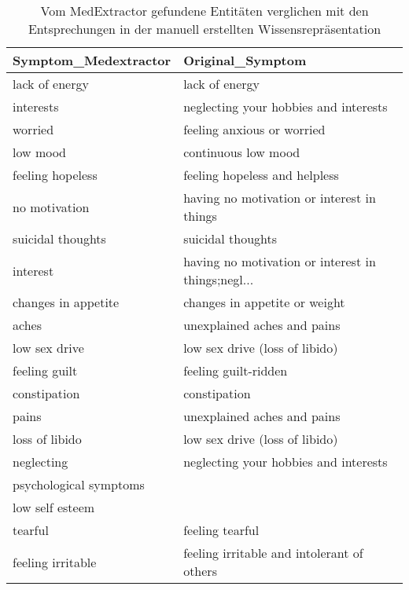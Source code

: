 \begin{table}
\begin{center}
\begin{tabular}{ll}
\toprule
  Symptom\_Medextractor &                                   Original\_Symptom \\
\midrule
        lack of energy &                                     lack of energy \\
             interests &              neglecting your hobbies and interests \\
               worried &                         feeling anxious or worried \\
              low mood &                                continuous low mood \\
      feeling hopeless &                      feeling hopeless and helpless \\
         no motivation &         having no motivation or interest in things \\
     suicidal thoughts &                                  suicidal thoughts \\
              interest & having no motivation or interest in things;negl... \\
   changes in appetite &                      changes in appetite or weight \\
                 aches &                        unexplained aches and pains \\
         low sex drive &                     low sex drive (loss of libido) \\
         feeling guilt &                               feeling guilt-ridden \\
          constipation &                                       constipation \\
                 pains &                        unexplained aches and pains \\
        loss of libido &                     low sex drive (loss of libido) \\
            neglecting &              neglecting your hobbies and interests \\
psychological symptoms &                                                    \\
       low self esteem &                                                    \\
               tearful &                                    feeling tearful \\
     feeling irritable &         feeling irritable and intolerant of others \\
\bottomrule
\end{tabular}
\caption{Vom MedExtractor gefundene Entitäten verglichen mit den Entsprechungen in der manuell erstellten Wissensrepräsentation}
\label{tab:vergleich_manuell_medextractor}
\end{center}
\end{table}

